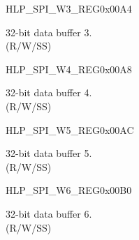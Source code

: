 \begin{register}{H}{LP\_SPI\_W3\_REG}{0x00A4}\label{regdesc:LPSPIW3REG}
%
\regnewline%
\begin{regdesc}\begin{reglist}
\label{fielddesc:LPSPIBUF3}\item [LP\_SPI\_BUF3] 32-bit data buffer 3. \\
(R/W/SS)
\end{reglist}\end{regdesc}
\end{register}


\begin{register}{H}{LP\_SPI\_W4\_REG}{0x00A8}\label{regdesc:LPSPIW4REG}
%
\regnewline%
\begin{regdesc}\begin{reglist}
\label{fielddesc:LPSPIBUF4}\item [LP\_SPI\_BUF4] 32-bit data buffer 4.\\
(R/W/SS)
\end{reglist}\end{regdesc}
\end{register}


\begin{register}{H}{LP\_SPI\_W5\_REG}{0x00AC}\label{regdesc:LPSPIW5REG}
%
\regnewline%
\begin{regdesc}\begin{reglist}
\label{fielddesc:LPSPIBUF5}\item [LP\_SPI\_BUF5] 32-bit data buffer 5. \\
(R/W/SS)
\end{reglist}\end{regdesc}
\end{register}


\begin{register}{H}{LP\_SPI\_W6\_REG}{0x00B0}\label{regdesc:LPSPIW6REG}
%
\regnewline%
\begin{regdesc}\begin{reglist}
\label{fielddesc:LPSPIBUF6}\item [LP\_SPI\_BUF6] 32-bit data buffer 6.\\
(R/W/SS)
\end{reglist}\end{regdesc}
\end{register}



